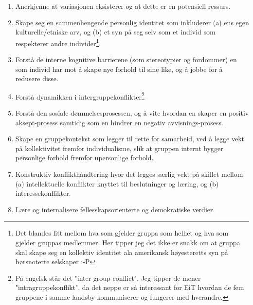 \documentclass[11pt]{article}
\begin{document}
		\begin{enumerate}

			\item Anerkjenne at variasjonen eksisterer og at dette er en potensiell ressurs.

			\item Skape seg en sammenhengende personlig identitet som inkluderer (a) ens egen kulturelle/etniske arv, og (b) et syn på seg selv som et individ som respekterer andre individer\footnote{Det blandes litt mellom hva som gjelder gruppa som helhet og hva som gjelder gruppas medlemmer. Her tipper jeg det ikke er snakk om at gruppa skal skape seg en kollektiv identitet ala amerikansk høyesteretts syn på børsnoterte selskaper :-P}.
			
			\item Forstå de interne kognitive barrierene (som stereotypier og fordommer) en som individ har mot å skape nye forhold til sine like, og å jobbe for å redusere disse.
			
			\item Forstå dynamikken i intergruppekonflikter\footnote{På engelsk står det "inter group conflict". Jeg tipper de mener "intragruppekonflikt", da det neppe er så interessant for EiT hvordan de fem gruppene i samme landsby kommuniserer og fungerer med hverandre.}
			
			\item Forstå den sosiale dømmelsesprosessen, og å vite hvordan en skaper en positiv aksept-prosess samtidig som en hindrer en negativ avvisnings-prosess.
			
			\item Skape en gruppekontekst som legger til rette for samarbeid, ved å legge vekt på kollektivitet fremfor individualisme, slik at gruppen internt bygger personlige forhold fremfor upersonlige forhold.
			
			\item Konstruktiv konflikthåndtering hvor det legges særlig vekt på skillet mellom (a) intellektuelle konflikter knyttet til beslutninger og læring, og (b) interessekonflikter.
			
			\item Lære og internalisere fellesskapsorienterte og demokratiske verdier.
		\end{enumerate}
	
\end{document}
